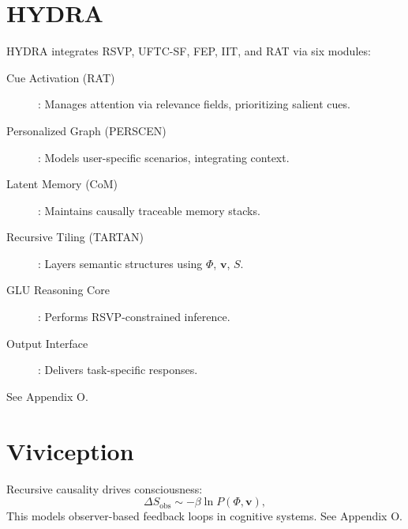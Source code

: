 \documentclass[12pt]{report}
\newcommand{\PhiRSVP}{\Phi}
\newcommand{\vRSVP}{\mathbf{v}}
\newcommand{\SRSVP}{S}
\begin{document}
\chapter{HYDRA}
HYDRA integrates RSVP, UFTC-SF, FEP, IIT, and RAT via six modules:
\begin{description}
    \item[Cue Activation (RAT)]: Manages attention via relevance fields, prioritizing salient cues.
    \item[Personalized Graph (PERSCEN)]: Models user-specific scenarios, integrating context.
    \item[Latent Memory (CoM)]: Maintains causally traceable memory stacks.
    \item[Recursive Tiling (TARTAN)]: Layers semantic structures using \(\PhiRSVP\), \(\vRSVP\), \(\SRSVP\).
    \item[GLU Reasoning Core]: Performs RSVP-constrained inference.
    \item[Output Interface]: Delivers task-specific responses.
\end{description}
See Appendix O.

\chapter{Viviception}
Recursive causality drives consciousness:
\begin{equation}
\Delta \SRSVP_{\text{obs}} \sim -\beta \ln P(\PhiRSVP, \vRSVP), \label{eq:viviception}
\end{equation}
This models observer-based feedback loops in cognitive systems. See Appendix O.
\end{document}
